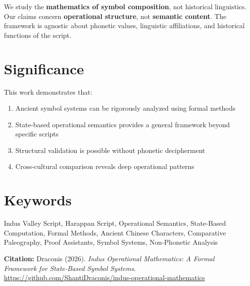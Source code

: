 We study the \textbf{mathematics of symbol composition}, not historical linguistics. Our claims concern \textbf{operational structure}, not \textbf{semantic content}. The framework is agnostic about phonetic values, linguistic affiliations, and historical functions of the script.

\section*{Significance}

This work demonstrates that:
\begin{enumerate}
    \item Ancient symbol systems can be rigorously analyzed using formal methods
    \item State-based operational semantics provides a general framework beyond specific scripts
    \item Structural validation is possible without phonetic decipherment
    \item Cross-cultural comparison reveals deep operational patterns
\end{enumerate}

\section*{Keywords}

Indus Valley Script, Harappan Script, Operational Semantics, State-Based Computation, Formal Methods, Ancient Chinese Characters, Comparative Paleography, Proof Assistants, Symbol Systems, Non-Phonetic Analysis

\vfill

\noindent\textbf{Citation:} Draconis (2026). \textit{Indus Operational Mathematics: A Formal Framework for State-Based Symbol Systems}. \url{https://github.com/ShantiDraconis/indus-operational-mathematics}
